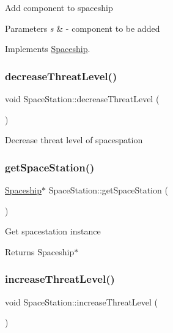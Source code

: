 Add component to spaceship 
\begin{DoxyParams}{Parameters}
{\em s} & -\/ component to be added \\
\hline
\end{DoxyParams}


Implements \hyperlink{classSpaceship_ac1b4673a691cd100708ddea08cd9f192}{Spaceship}.

\mbox{\label{classSpaceStation_a0cb67593dc02495793635adb66f595e9}} 
\subsubsection{\texorpdfstring{decrease\+Threat\+Level()}{decreaseThreatLevel()}}
{\footnotesize\ttfamily void Space\+Station\+::decrease\+Threat\+Level (\begin{DoxyParamCaption}{ }\end{DoxyParamCaption})}

Decrease threat level of spacespation \mbox{\label{classSpaceStation_acffc1d332b904f06b55288819e69f3c8}} 
\subsubsection{\texorpdfstring{get\+Space\+Station()}{getSpaceStation()}}
{\footnotesize\ttfamily \hyperlink{classSpaceship}{Spaceship}$\ast$ Space\+Station\+::get\+Space\+Station (\begin{DoxyParamCaption}{ }\end{DoxyParamCaption})}

Get spacestation instance \begin{DoxyReturn}{Returns}
Spaceship$\ast$ 
\end{DoxyReturn}
\mbox{\label{classSpaceStation_aa9390e8af0d69fc176c190f8f6891736}} 
\subsubsection{\texorpdfstring{increase\+Threat\+Level()}{increaseThreatLevel()}}
{\footnotesize\ttfamily void Space\+Station\+::increase\+Threat\+Level (\begin{DoxyParamCaption}{ }\end{DoxyParamCaption})}

